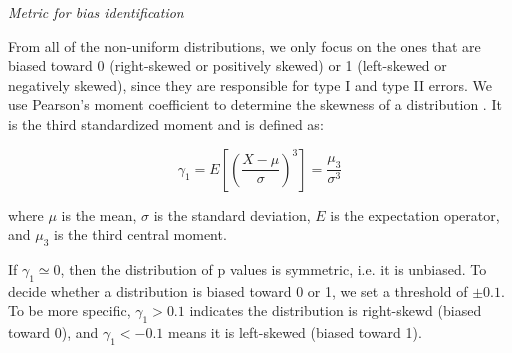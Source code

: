 \documentclass[Minh_PhD_thesis.tex]{subfiles}
\begin{document}
\textit{Metric for bias identification}

From all of the non-uniform distributions, we only focus on the ones that are biased toward 0 (right-skewed or positively skewed) or 1 (left-skewed or negatively skewed), since they are responsible for type I and type II errors. We use Pearson's moment coefficient to determine the skewness of a distribution \cite{pearson1895contributions}. It is the third standardized moment and is defined as:

\begin{equation}\label{eq:skewness}
\gamma_1 = E\left[\left(\frac{X-\mu}{\sigma}\right)^3\right] = \frac{\mu_3}{\sigma^3}
\end{equation}

where $\mu$ is the mean, $\sigma$ is the standard deviation, $E$ is the expectation operator, and $\mu_3$ is the third central moment.

If $\gamma_1 \simeq 0$, then the distribution of p values is symmetric, i.e. it is unbiased. 
To decide whether a distribution is biased toward 0 or 1, we set a threshold of $\pm 0.1$.
To be more specific, $\gamma_1 > 0.1$ indicates the distribution is right-skewd (biased toward 0), and $\gamma_1 < -0.1$ means it is left-skewed (biased toward 1).
\end{document}
